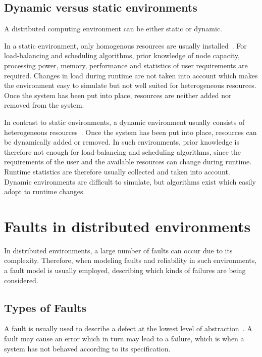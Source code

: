 \documentclass{cslthse-msc}
\begin{document}
\subsection{Dynamic versus static environments} \label{subsec:background_dyn_stat_env}
A distributed computing environment can be either static or dynamic.

In a static environment, only homogenous resources are usually installed~\cite{compStudyLoadAndCloud}. For load-balancing and scheduling algorithms, prior knowledge of node capacity, processing power, memory, performance and statistics of user requirements are required. Changes in load during runtime are not taken into account which makes the environment easy to simulate but not well suited for heterogeneous resources. Once the system has been put into place, resources are neither added nor removed from the system.

In contrast to static environments, a dynamic environment usually consists of heterogeneous resources~\cite{compStudyLoadAndCloud}. Once the system has been put into place, resources can be dynamically added or removed. In such environments, prior knowledge is therefore not enough for load-balancing and scheduling algorithms, since the requirements of the user and the available resources can change during runtime. Runtime statistics are therefore usually collected and taken into account. Dynamic environments are difficult to simulate, but algorithms exist which easily adopt to runtime changes. 


\section{Faults in distributed environments} \label{sec:background_faults_distr_env}
In distributed environments, a large number of faults can occur due to its complexity. Therefore, when modeling faults and reliability in such environments, a fault model is usually employed, describing which kinds of failures are being considered.

\subsection{Types of Faults} \label{subsec:background_types_of_faults}
A fault is usually used to describe a defect at the lowest level of abstraction~\cite{faultTolerantFundamentals}. A fault may cause an error which in turn may lead to a failure, which is when a system has not behaved according to its specification.
\end{document}
